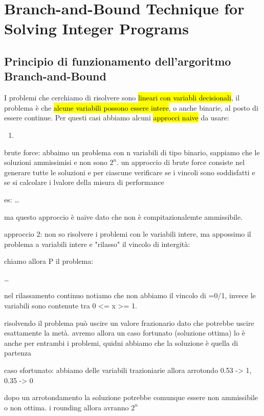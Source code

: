 \newpage
\section{Branch-and-Bound Technique for Solving Integer Programs}

\subsection{Principio di funzionamento dell'argoritmo Branch-and-Bound}

I problemi che cerchiamo di risolvere sono \hl{lineari con variabli decisionali}, il problema è che \hl{alcune variabili possono essere intere}, o anche binarie, al posto di essere continue. Per questi casi abbiamo alcuni \hl{approcci naive} da usare:

\begin{enumerate}
    \item 
\end{enumerate}
brute force:
abbaimo un problema con n variabili di tipo binario, sappiamo che le soluzioni ammissimisi e non sono $2^n$. un approccio di brute force consiste nel generare tutte le soluzioni e per ciascune verificare se i vincoli sono soddisfatti e se si calcolare i lvalore della misura di performance

es:
\dots

ma questo approccio è naive dato che non è compitazionalemte ammissibile.

approccio 2:
non so risolvere i problemi con le variabili intere, ma appossimo il problema a variabili intere e "rilasso" il vincolo di intergità:

chiamo allora P  il problema:

\dots

nel rilassamento continuo notiamo che non abbiamo il vincolo di =0/1, invece le variabili sono contenute tra 0 <= x >= 1.

risolvendo il problema può uscire un valore frazionario dato che potrebbe uscire esattamente la metà. avremo allora un caso fortunato (soluzione ottima) lo è anche per entrambi i problemi, quidni abbiamo che la soluzione è quella di partenza


caso sfortunato: abbiamo delle variabili trazioniarie allora arrotondo 0.53 -> 1, 0.35 -> 0

dopo un arrotondamento la soluzione potrebbe comunque essere non ammissibile o non ottima. i rounding allora avranno $2^{n}$



